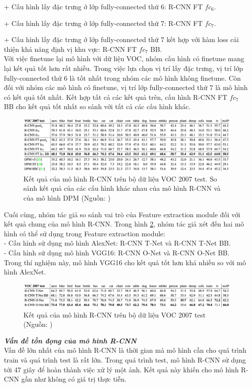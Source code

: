 {    + Cấu hình lấy đặc trưng ở lớp fully-connected thứ 6: R-CNN FT ${fc}_{6}$. \par
    + Cấu hình lấy đặc trưng ở lớp fully-connected thứ 7: R-CNN FT ${fc}_{7}$. \par
    + Cấu hình lấy đặc trưng ở lớp fully-connected thứ 7 kết hợp với hàm loss cải thiện khả năng định vị khu vực: R-CNN FT ${fc}_{7}$ BB. \\
    Với việc finetune lại mô hình với dữ liệu VOC, nhóm cấu hình có finetune mang lại kết quả tốt hơn rất nhiều.
    Trong việc lựa chọn vị trí lấy đặc trưng, vị trí lớp fully-connected thứ 6 là tốt nhất trong nhóm các mô hình không finetune.
    Còn đối với nhóm các mô hình có finetune, vị trí lớp fully-connected thứ 7 là mô hình có kết quả tốt nhất.
    Kết hợp tất cả các kết quả trên, cấu hình R-CNN FT ${fc}_{7}$ BB cho kết quả tốt nhất so sánh với tất cả các cấu hình khác.
    \begin{figure}[H]
        \centering
        \includegraphics[width=15cm] {images/rcnn_results_1}
        \caption{Kết quả của mô hình R-CNN trên bộ dữ liệu VOC 2007 test. So sánh kết quả của các cấu hình khác nhau của mô hình R-CNN và của mô hình DPM (Nguồn: \cite{girshick2014rich})}
        \label{fig:rcnn_results_1}
    \end{figure}
    \noindent
    Cuối cùng, nhóm tác giả so sánh vai trò của Feature extraction module đối với kết quả chung của mô hình R-CNN.
    Trong hình \ref{fig:rcnn_results_2}, nhóm tác giả xét đến hai mô hình có thể sử dụng trong Feature extraction module: \\
    - Cấu hình sử dụng mô hình AlexNet: R-CNN T-Net và R-CNN T-Net BB. \\
    - Cấu hình sử dụng mô hình VGG16: R-CNN O-Net và R-CNN O-Net BB. \\
    Trong thí nghiệm này, mô hình VGG16 cho kết quả tốt hơn khá nhiều so với mô hình AlexNet.
    \begin{figure}[H]
        \centering
        \includegraphics[width=15cm] {images/rcnn_results_2}
        \caption{Kết quả của mô hình R-CNN trên bộ dữ liệu VOC 2007 test (Nguồn: \cite{girshick2014rich})}
        \label{fig:rcnn_results_2}
    \end{figure}

    \noindent
    \textbf{\textit{Vấn đề tồn đọng của mô hình R-CNN}} \\
    Vấn đề lớn nhất của mô hình R-CNN là thời gian mà mô hình cần cho quá trình train và quá trình test là rất lớn.
    Trong quá trình test, mô hình R-CNN sử dụng tới 47 giây để hoàn thành việc xử lý một ảnh.
    Kết quả này khiến cho mô hình R-CNN gần như không có giá trị thực tiễn.
}